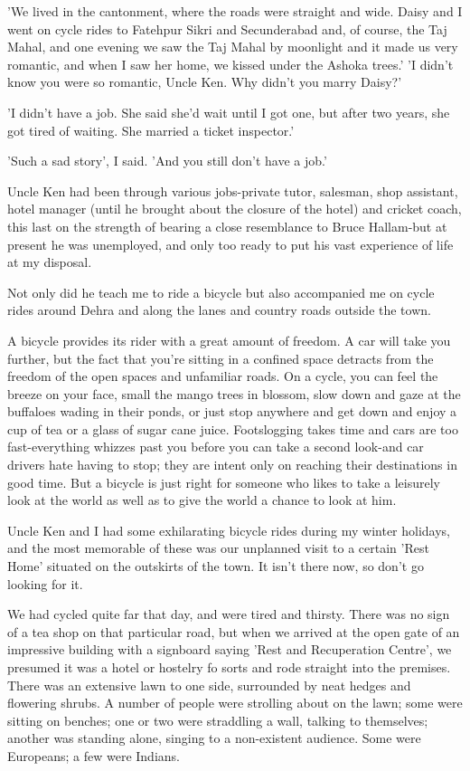 \par
'We lived in the cantonment, where the roads were straight and wide. Daisy and I went on cycle rides to Fatehpur Sikri and Secunderabad and, of course, the Taj Mahal, and one evening we saw the Taj Mahal by moonlight and it made us very romantic, and when I saw her home, we kissed under the Ashoka trees.'
'I didn't know you were so romantic, Uncle Ken. Why didn't you marry Daisy?'
\par
'I didn't have a job. She said she'd wait until I got one, but after two years, she got tired of waiting. She married a ticket inspector.'
\par
'Such a sad story', I said. 'And you still don't have a job.'
\par
Uncle Ken had been through various jobs-private tutor, salesman, shop assistant, hotel manager (until he brought about the closure of the hotel) and cricket coach, this last on the strength of bearing a close resemblance to Bruce Hallam-but at present he was unemployed, and only too ready to put his vast experience of life at my disposal.
\par
Not only did he teach me to ride a bicycle but also accompanied me on cycle rides around Dehra and along the lanes and country roads outside the town.
\par
A bicycle provides its rider with a great amount of freedom. A car will take you further, but the fact that you're sitting in a confined space detracts from the freedom of the open spaces and unfamiliar roads. On a cycle, you can feel the breeze on your face, small the mango trees in blossom, slow down and gaze at the buffaloes wading in their ponds, or just stop anywhere and get down and enjoy a cup of tea or a glass of sugar cane juice. Footslogging takes time and cars are too fast-everything whizzes past you before you can take a second look-and car drivers hate having to stop; they are intent only on reaching their destinations in good time. But a bicycle is just right for someone who likes to take a leisurely look at the world as well as to give the world a chance to look at him.
\par
Uncle Ken and I had some exhilarating bicycle rides during my winter holidays, and the most memorable of these was our unplanned visit to a certain 'Rest Home' situated on the outskirts of the town. It isn't there now, so don't go looking for it.
\par
We had cycled quite far that day, and were tired and thirsty. There was no sign of a tea shop on that particular road, but when we arrived at the open gate of an impressive building with a signboard saying 'Rest and Recuperation Centre', we presumed it was a hotel or hostelry fo sorts and rode straight into the premises. There was an extensive lawn to one side, surrounded by neat hedges and flowering shrubs. A number of people were strolling about on the lawn; some were sitting on benches; one or two were straddling a wall, talking to themselves; another was standing alone, singing to a non-existent audience. Some were Europeans; a few were Indians.
